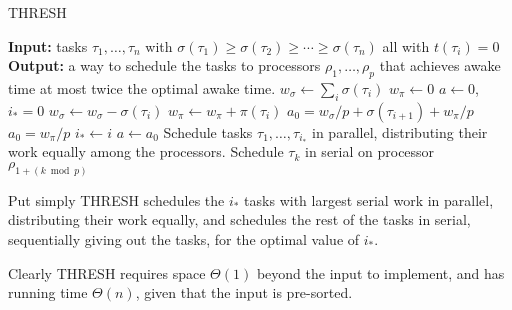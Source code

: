 \begin{algorithm}
  \caption{THRESH}
  \label{alg:thresh}
  \begin{algorithmic}
    \State \textbf{Input:} tasks $\tau_1,\ldots, \tau_n$ with
    $\sigma(\tau_1) \ge \sigma(\tau_2)\ge \cdots \ge
    \sigma(\tau_n)$ all with $t(\tau_i) = 0$
    \State \textbf{Output:} a way to schedule the tasks to
    processors $\rho_1, \ldots, \rho_p$ that achieves awake time
    at most twice the optimal awake time.
    \State
    \State $w_\sigma \gets \sum_i \sigma(\tau_i)$
    \State $w_\pi \gets 0$
    \State $a \gets 0$, $i_* = 0$
      \State $w_\sigma \gets w_\sigma - \sigma(\tau_i)$
      \State $w_\pi \gets w_\pi + \pi(\tau_i)$
        \State $a_0 = w_\sigma / p + \sigma(\tau_{i+1}) + w_\pi/p$
      \Else
        \State $a_0 = w_\pi/p$
      \EndIf
        \State $i_* \gets i$
        \State $a \gets a_0$
      \EndIf
    \EndFor
    \State Schedule tasks $\tau_1, \ldots, \tau_{i_*}$ in
    parallel, distributing their work equally among the
    processors.
    \State Schedule $\tau_{k}$ in serial on processor $\rho_{1+(k \bmod p)}$
    \EndFor
  \end{algorithmic}
\end{algorithm}

Put simply THRESH schedules the $i_*$ tasks with largest serial
work in parallel, distributing their work equally, and schedules
the rest of the tasks in serial, sequentially giving out the
tasks, for the optimal value of $i_*$.

Clearly THRESH requires space $\Theta(1)$ beyond the input to
implement, and has running time $\Theta(n)$, given that the input
is pre-sorted.

